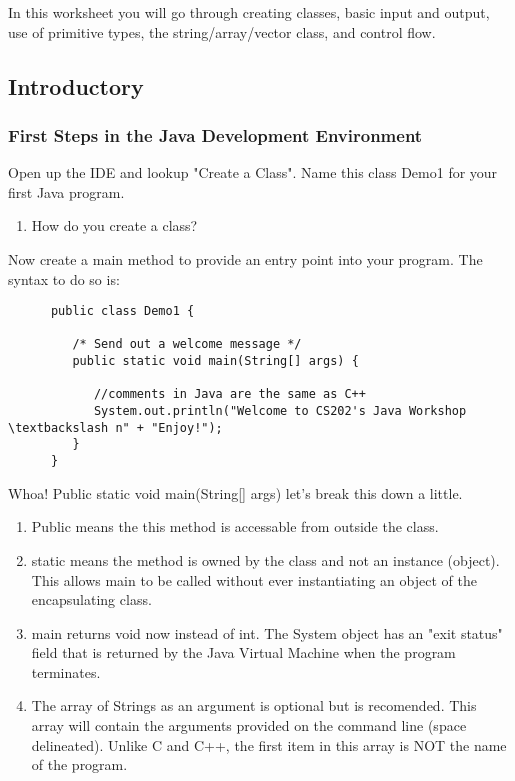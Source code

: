 \documentclass[../../main.tex]{subfiles}
\begin{document}
In this worksheet you will go through creating classes, basic input and output,
use of primitive types, the string/array/vector class, and control flow.
\subsection{Introductory}
\subsubsection{First Steps in the Java Development Environment}
\begin{steps}
   \item Open up the IDE and lookup "Create a Class". Name this class Demo1 for your first Java program.
   \begin{enumerate}[label=\Alph*.]
   \item How do you create a class?
   \end{enumerate} 
   \item Now create a main method to provide an entry point into your program. The syntax to do so is: \\
      \begin{verbatim}
      public class Demo1 {

         /* Send out a welcome message */
         public static void main(String[] args) {

            //comments in Java are the same as C++
            System.out.println("Welcome to CS202's Java Workshop \textbackslash n" + "Enjoy!");
         }
      }
\end{verbatim}
   Whoa! Public static void main(String[] args) let's break this down a little.
   \begin{enumerate}[label=\Alph*.]
   \item Public means the this method is accessable from outside the class.
   \item static means the method is owned by the class and not an instance (object). This allows main to be called without ever instantiating an object of the encapsulating class.
   \item main returns void now instead of int. The System object has an "exit status" field that is returned by the Java Virtual Machine when the program terminates.
   \item The array of Strings as an argument is optional but is recomended. This array will contain the arguments provided on the command line (space delineated). Unlike C and C++, the first item in this array is NOT the name of the program.
   \end{enumerate} 


\end{steps}
\end{document}
